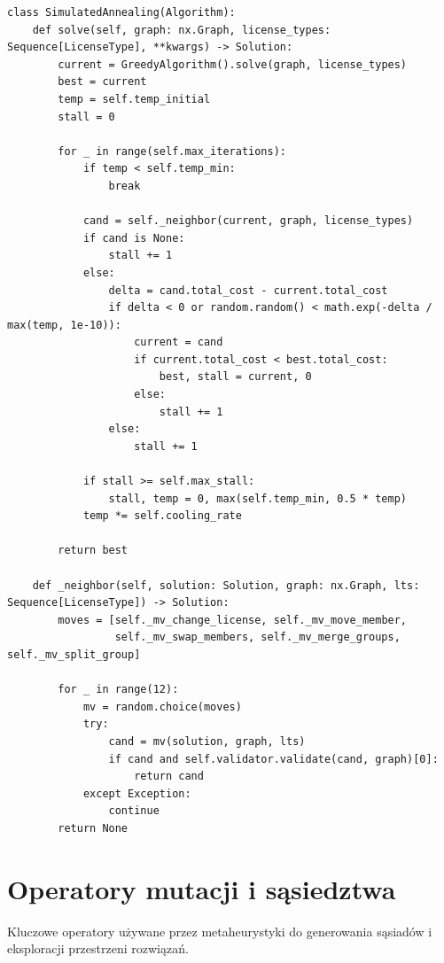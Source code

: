     {\footnotesize
        \begin{verbatim}
class SimulatedAnnealing(Algorithm):
    def solve(self, graph: nx.Graph, license_types: Sequence[LicenseType], **kwargs) -> Solution:
        current = GreedyAlgorithm().solve(graph, license_types)
        best = current
        temp = self.temp_initial
        stall = 0

        for _ in range(self.max_iterations):
            if temp < self.temp_min:
                break

            cand = self._neighbor(current, graph, license_types)
            if cand is None:
                stall += 1
            else:
                delta = cand.total_cost - current.total_cost
                if delta < 0 or random.random() < math.exp(-delta / max(temp, 1e-10)):
                    current = cand
                    if current.total_cost < best.total_cost:
                        best, stall = current, 0
                    else:
                        stall += 1
                else:
                    stall += 1

            if stall >= self.max_stall:
                stall, temp = 0, max(self.temp_min, 0.5 * temp)
            temp *= self.cooling_rate

        return best

    def _neighbor(self, solution: Solution, graph: nx.Graph, lts: Sequence[LicenseType]) -> Solution:
        moves = [self._mv_change_license, self._mv_move_member,
                 self._mv_swap_members, self._mv_merge_groups, self._mv_split_group]

        for _ in range(12):
            mv = random.choice(moves)
            try:
                cand = mv(solution, graph, lts)
                if cand and self.validator.validate(cand, graph)[0]:
                    return cand
            except Exception:
                continue
        return None
\end{verbatim}
    }

\section{Operatory mutacji i sąsiedztwa}
Kluczowe operatory używane przez metaheurystyki do generowania
sąsiadów i eksploracji przestrzeni rozwiązań.

